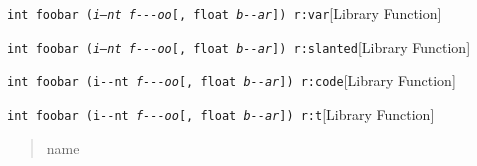 \documentclass{book}
\begin{document}
%
\noindent\texttt{int foobar (\textnormal{\textsl{i--nt}} \textsl{f{-}{-}{-}oo}[, float \textsl{b{-}{-}ar}]) r:var}\hfill[Library Function]



%
\noindent\texttt{int foobar (\textnormal{\textsl{i--nt}} \textsl{f{-}{-}{-}oo}[, float \textsl{b{-}{-}ar}]) r:slanted}\hfill[Library Function]



%
\noindent\texttt{int foobar (\textnormal{\texttt{i{-}{-}nt}} \textsl{f{-}{-}{-}oo}[, float \textsl{b{-}{-}ar}]) r:code}\hfill[Library Function]



%
\noindent\texttt{int foobar (\textnormal{\texttt{i{-}{-}nt}} \textsl{f{-}{-}{-}oo}[, float \textsl{b{-}{-}ar}]) r:t}\hfill[Library Function]



%
\begin{quote}
\unskip{\parskip=0pt\noindent}%
name
\end{quote}
\end{document}
